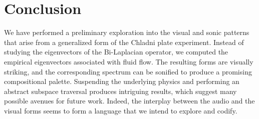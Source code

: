 \documentclass[11pt]{article}
\begin{document}
\section*{Conclusion}

We have performed a preliminary exploration into the visual and sonic patterns that arise from a generalized form of the Chladni plate experiment. Instead of studying the eigenvectors of the Bi-Laplacian operator, we computed the empirical eigenvectors associated with fluid flow. The resulting forms are visually striking, and the corresponding spectrum can be sonified to produce a promising compositional palette. Suspending the underlying physics and performing an abstract subspace traversal produces intriguing results, which suggest many possible avenues for future work. Indeed, the interplay between the audio and the visual forms seems to form a language that we intend to explore and codify.







\fontsize{10}{12}

\end{document}
